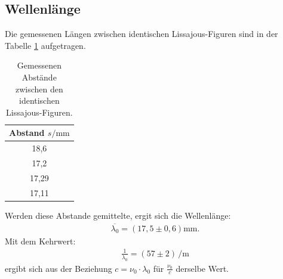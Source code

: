 \subsection{Wellenlänge }
Die gemessenen Längen zwischen identischen
Lissajous-Figuren sind in der Tabelle \ref{tab:wellen} aufgetragen.
\begin{table}
  \centering
  \caption{Gemessenen Abstände zwischen den identischen Lissajous-Figuren.}
  \label{tab:wellen}
  \begin{tabular}{c}
    \toprule
    Abstand $s/\si{\milli\meter}$\\
    \midrule
    18,6\\
    17,2\\
    17,29\\
    17,11\\
    \bottomrule
  \end{tabular}
\end{table}
Werden diese Abstande gemittelte, ergit sich
die Wellenlänge:
\begin{align}
  \overline{\lambda_0}=(17,5\pm 0,6) \si{\milli\meter}.
\end{align}
Mit dem Kehrwert:
\begin{align}
\frac{1}{\lambda_0}=(57\pm 2)\,\si{\per\meter}
\end{align}
ergibt sich aus der Beziehung $c=\nu_0\cdot\lambda_0$ für $\frac{\nu_0}{c}$
derselbe Wert.

